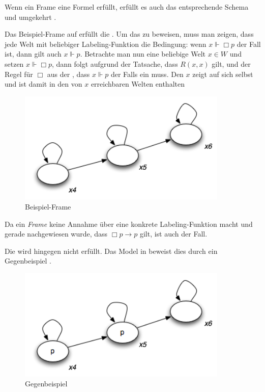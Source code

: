 Wenn ein Frame eine Formel erfüllt, erfüllt es auch das entsprechende Schema und umgekehrt .

\begin{example}
	Das Beispiel-Frame auf  erfüllt die \TFormel.
	Um das zu beweisen, muss man zeigen, dass jede Welt mit beliebiger Labeling-Funktion die Bedingung: wenn $x \Vdash \Box p$ der Fall ist, dann gilt auch $x \Vdash p$.
	Betrachte man nun eine beliebige Welt $x \in W$ und setzen $x \Vdash \Box p$, dann folgt aufgrund der Tatsache, dass $R(x,x)$ gilt, und der Regel für $\Box$ aus der , dass $x \Vdash p$ der Falls ein muss.
	Den $x$ zeigt auf sich selbst und ist damit in den von $x$ erreichbaren Welten enthalten

	\begin{figure}[h!]
		\centering
		\includegraphics[width=10cm]{Images/Kripke02}
		\caption{Beispiel-Frame}
		\label{fig:Kripke02}
	\end{figure}

	Da ein \emph{Frame} keine Annahme über eine konkrete Labeling-Funktion macht und gerade nachgewiesen wurde, dass $\Box p \rightarrow p$ gilt, ist auch \TFormel der Fall.
	
	Die \vierFormel wird hingegen nicht erfüllt.
	Das Model in  beweist dies durch ein Gegenbeispiel
	.

	\begin{figure}[h!]
		\centering
		\includegraphics[width=10cm]{Images/Kripke03}
		\caption{Gegenbeispiel}
		\label{fig:Kripke03}
	\end{figure}

\end{example}


